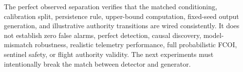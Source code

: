 The perfect observed separation verifies that the matched conditioning, calibration split, persistence rule, upper-bound computation, fixed-seed output generation, and illustrative authority transitions are wired consistently. It does not establish zero false alarms, perfect detection, causal discovery, model-mismatch robustness, realistic telemetry performance, full probabilistic FCOI, sentinel safety, or flight authority validity. The next experiments must intentionally break the match between detector and generator.
